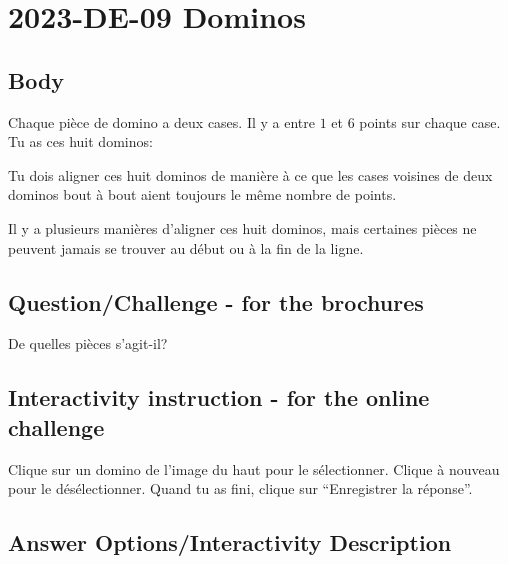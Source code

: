 \documentclass[a4paper,11pt]{report}
\newcommand{\taskGraphicsFolder}{..}
\begin{document}
\section*{\centering{} 2023-DE-09 Dominos}


\subsection*{Body}

Chaque pièce de domino a deux cases. Il y a entre $1$ et $6$ points sur chaque case. Tu as ces huit dominos:

{\centering%
\par}

Tu dois aligner ces huit dominos de manière à ce que les cases voisines de deux dominos bout à bout aient toujours le même nombre de points.

{\centering%
\raisebox{-0.5ex}{} \raisebox{-0.5ex}{}\par}

Il y a plusieurs manières d’aligner ces huit dominos, mais certaines pièces ne peuvent jamais se trouver au début ou à la fin de la ligne.

{\centering%
\par}

{\em


\subsection*{Question/Challenge - for the brochures}

De quelles pièces s’agit-il?

}


\subsection*{Interactivity instruction - for the online challenge}

Clique sur un domino de l’image du haut pour le sélectionner. Clique à nouveau pour le désélectionner. Quand tu as fini, clique sur “Enregistrer la réponse”.

\begingroup
\renewcommand{\arraystretch}{1.5}
\subsection*{Answer Options/Interactivity Description}
\end{document}
